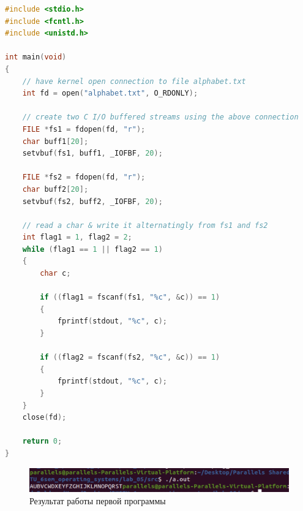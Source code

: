 \documentclass[12pt]{report}
\begin{document}
\begin{lstlisting}[language=c, label=p1, caption=Первая программа]
#include <stdio.h>
#include <fcntl.h>
#include <unistd.h>

int main(void)
{
	// have kernel open connection to file alphabet.txt
    int fd = open("alphabet.txt", O_RDONLY);

	// create two C I/O buffered streams using the above connection 
    FILE *fs1 = fdopen(fd, "r");
    char buff1[20];
    setvbuf(fs1, buff1, _IOFBF, 20);

    FILE *fs2 = fdopen(fd, "r");
    char buff2[20];
    setvbuf(fs2, buff2, _IOFBF, 20);

	// read a char & write it alternatingly from fs1 and fs2
    int flag1 = 1, flag2 = 2;
    while (flag1 == 1 || flag2 == 1)
    {
        char c;

        if ((flag1 = fscanf(fs1, "%c", &c)) == 1)
        {
            fprintf(stdout, "%c", c);
        }

        if ((flag2 = fscanf(fs2, "%c", &c)) == 1)
        {
            fprintf(stdout, "%c", c);
        }
    }
    close(fd);

    return 0;
}
\end{lstlisting}



\begin{figure}[H]
	\centering
	\includegraphics[scale=0.8]{img/prog_01.png}
	\caption{Результат работы первой программы}
	\label{fig:prog_01}
\end{figure}
\end{document}
